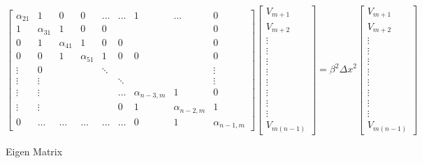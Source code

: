 \documentclass[letter]{article}
\begin{document}
	\begin{figure}[h]	
	\[ 		 
	\begin{bmatrix}
		\alpha_{21} & 1              & 0              & 0              & \hdots & \hdots & 1    & \hdots         & 0              \\
1            & \alpha_{31} & 1              & 0              & 0      &        &                &                & 0              \\
0            & 1              & \alpha_{41} & 1              & 0      & 0      &                &                & 0              \\
0            & 0              & 1              & \alpha_{51} & 1      & 0      & 0              &                & 0              \\
\vdots       &  0      &                &                & \ddots &        &                &                & \vdots         \\
\vdots       &  \vdots &                &                &        & \ddots &                &                & \vdots         \\
\vdots       &  \vdots &                &                &        & \hdots      & \alpha_{n-3,m} & 1              & 0              \\
\vdots       &  \vdots &                &                &        & 0      & 1              & \alpha_{n-2,m} & 1              \\
0            & \hdots         & \hdots         & \hdots         & \hdots & \hdots & 0              & 1              & \alpha_{n-1,m}
	\end{bmatrix}
	\begin{bmatrix}
		V_{m+1}\\
		V_{m+2}\\
		\vdots\\
		\vdots\\
		\vdots\\
		\vdots\\
		\vdots\\
		\vdots\\
		\vdots\\
		\vdots\\
		V_{m(n-1)}
	\end{bmatrix}
	= \beta^2 {\Delta x}^2
	\begin{bmatrix}
		V_{m+1}\\
		V_{m+2}\\
		\vdots\\
		\vdots\\
		\vdots\\
		\vdots\\
		\vdots\\
		\vdots\\
		\vdots\\
		\vdots\\
		V_{m(n-1)}
	\end{bmatrix}		
	\]
	\caption{Eigen Matrix}
	\label{matrix:eigenMatrix}	
	\end{figure}
	
	
	
	
\end{document}
